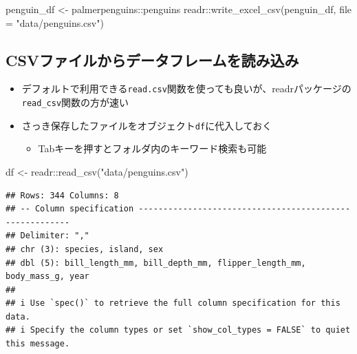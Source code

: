 \documentclass[
]{ltjsarticle}
\newenvironment{Shaded}{\begin{snugshade}}{\end{snugshade}}
\newcommand{\AttributeTok}[1]{\textcolor[rgb]{0.77,0.63,0.00}{#1}}
\newcommand{\FunctionTok}[1]{\textcolor[rgb]{0.00,0.00,0.00}{#1}}
\newcommand{\NormalTok}[1]{#1}
\newcommand{\OtherTok}[1]{\textcolor[rgb]{0.56,0.35,0.01}{#1}}
\newcommand{\SpecialCharTok}[1]{\textcolor[rgb]{0.00,0.00,0.00}{#1}}
\newcommand{\StringTok}[1]{\textcolor[rgb]{0.31,0.60,0.02}{#1}}
\providecommand{\tightlist}{%
  \setlength{\itemsep}{0pt}\setlength{\parskip}{0pt}}
\begin{document}
\begin{Shaded}
\begin{Highlighting}[]
\NormalTok{penguin\_df }\OtherTok{\textless{}{-}}\NormalTok{ palmerpenguins}\SpecialCharTok{::}\NormalTok{penguins}
\NormalTok{readr}\SpecialCharTok{::}\FunctionTok{write\_excel\_csv}\NormalTok{(penguin\_df, }\AttributeTok{file =} \StringTok{"data/penguins.csv"}\NormalTok{)}
\end{Highlighting}
\end{Shaded}

\hypertarget{csvux30d5ux30a1ux30a4ux30ebux304bux3089ux30c7ux30fcux30bfux30d5ux30ecux30fcux30e0ux3092ux8aadux307fux8fbcux307f}{%
\subsection{CSVファイルからデータフレームを読み込み}\label{csvux30d5ux30a1ux30a4ux30ebux304bux3089ux30c7ux30fcux30bfux30d5ux30ecux30fcux30e0ux3092ux8aadux307fux8fbcux307f}}

\begin{itemize}
\tightlist
\item
  デフォルトで利用できる\texttt{read.csv}関数を使っても良いが、readrパッケージの\texttt{read\_csv}関数の方が速い
\item
  さっき保存したファイルをオブジェクト\texttt{df}に代入しておく

  \begin{itemize}
  \tightlist
  \item
    Tabキーを押すとフォルダ内のキーワード検索も可能
  \end{itemize}
\end{itemize}

\begin{Shaded}
\begin{Highlighting}[]
\NormalTok{df }\OtherTok{\textless{}{-}}\NormalTok{ readr}\SpecialCharTok{::}\FunctionTok{read\_csv}\NormalTok{(}\StringTok{"data/penguins.csv"}\NormalTok{)}
\end{Highlighting}
\end{Shaded}

\begin{verbatim}
## Rows: 344 Columns: 8
## -- Column specification --------------------------------------------------------
## Delimiter: ","
## chr (3): species, island, sex
## dbl (5): bill_length_mm, bill_depth_mm, flipper_length_mm, body_mass_g, year
## 
## i Use `spec()` to retrieve the full column specification for this data.
## i Specify the column types or set `show_col_types = FALSE` to quiet this message.
\end{verbatim}
\end{document}
